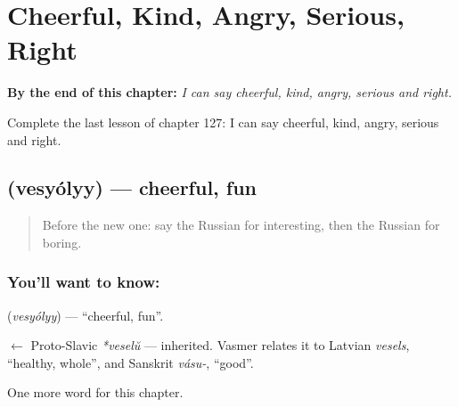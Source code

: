 
\chapter{Cheerful, Kind, Angry, Serious, Right}
\label{ch:ru-cheerful-kind-angry-serious-right}

\begin{chapteropening}
\textbf{By the end of this chapter:} \emph{I can say cheerful, kind, angry, serious and right.}

Complete the last lesson of chapter 127: I can say cheerful, kind, angry, serious and right.
\end{chapteropening}

\section[\texorpdfstring{\ru{весёлый} (vesyólyy)}{весёлый (vesyólyy)}]{ (vesyólyy) — cheerful, fun}

\label{lesson:RU-C127-cheerful}



\begin{quote}
Before the new one: say the Russian for interesting, then the Russian for boring.
\end{quote}

\subsection*{You'll want to know: }
\textbf{} (\emph{vesyólyy}) — \textquotedblleft{}cheerful, fun\textquotedblright{}.

\begin{cousinweb}
\textbf{} $\leftarrow$ Proto-Slavic \emph{*veselŭ} — inherited. Vasmer relates it to Latvian \emph{vesels}, \textquotedblleft{}healthy, whole\textquotedblright{}, and Sanskrit \emph{vásu-}, \textquotedblleft{}good\textquotedblright{}.
\end{cousinweb}

\begin{grammarlens}[title={What you've built}]
One more word for this chapter.
\end{grammarlens}

